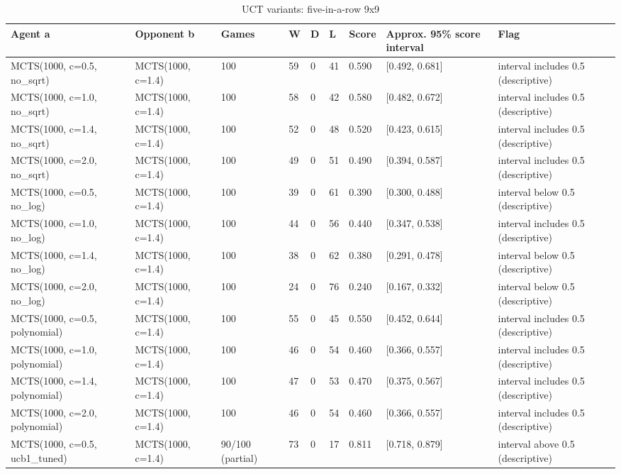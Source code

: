\begin{table}[!t]
\centering
\caption{UCT variants: five-in-a-row 9x9}
\label{tab:formula_gomoku9}
\small
\begin{tabular}{lllllllll}
\toprule
Agent a & Opponent b & Games & W & D & L & Score & Approx. 95\% score interval & Flag \\
\midrule
MCTS(1000, c=0.5, no\_sqrt) & MCTS(1000, c=1.4) & 100 & 59 & 0 & 41 & 0.590 & [0.492, 0.681] & interval includes 0.5 (descriptive) \\
MCTS(1000, c=1.0, no\_sqrt) & MCTS(1000, c=1.4) & 100 & 58 & 0 & 42 & 0.580 & [0.482, 0.672] & interval includes 0.5 (descriptive) \\
MCTS(1000, c=1.4, no\_sqrt) & MCTS(1000, c=1.4) & 100 & 52 & 0 & 48 & 0.520 & [0.423, 0.615] & interval includes 0.5 (descriptive) \\
MCTS(1000, c=2.0, no\_sqrt) & MCTS(1000, c=1.4) & 100 & 49 & 0 & 51 & 0.490 & [0.394, 0.587] & interval includes 0.5 (descriptive) \\
MCTS(1000, c=0.5, no\_log) & MCTS(1000, c=1.4) & 100 & 39 & 0 & 61 & 0.390 & [0.300, 0.488] & interval below 0.5 (descriptive) \\
MCTS(1000, c=1.0, no\_log) & MCTS(1000, c=1.4) & 100 & 44 & 0 & 56 & 0.440 & [0.347, 0.538] & interval includes 0.5 (descriptive) \\
MCTS(1000, c=1.4, no\_log) & MCTS(1000, c=1.4) & 100 & 38 & 0 & 62 & 0.380 & [0.291, 0.478] & interval below 0.5 (descriptive) \\
MCTS(1000, c=2.0, no\_log) & MCTS(1000, c=1.4) & 100 & 24 & 0 & 76 & 0.240 & [0.167, 0.332] & interval below 0.5 (descriptive) \\
MCTS(1000, c=0.5, polynomial) & MCTS(1000, c=1.4) & 100 & 55 & 0 & 45 & 0.550 & [0.452, 0.644] & interval includes 0.5 (descriptive) \\
MCTS(1000, c=1.0, polynomial) & MCTS(1000, c=1.4) & 100 & 46 & 0 & 54 & 0.460 & [0.366, 0.557] & interval includes 0.5 (descriptive) \\
MCTS(1000, c=1.4, polynomial) & MCTS(1000, c=1.4) & 100 & 47 & 0 & 53 & 0.470 & [0.375, 0.567] & interval includes 0.5 (descriptive) \\
MCTS(1000, c=2.0, polynomial) & MCTS(1000, c=1.4) & 100 & 46 & 0 & 54 & 0.460 & [0.366, 0.557] & interval includes 0.5 (descriptive) \\
MCTS(1000, c=0.5, ucb1\_tuned) & MCTS(1000, c=1.4) & 90/100 (partial) & 73 & 0 & 17 & 0.811 & [0.718, 0.879] & interval above 0.5 (descriptive) \\

\end{tabular}
\end{table}

